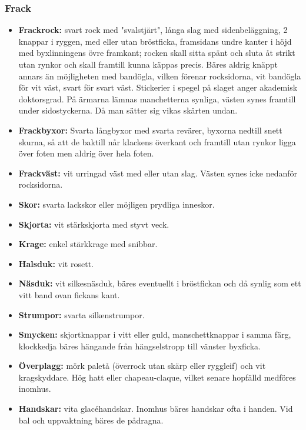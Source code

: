 \subsubsection*{\textbf{Frack}}
\begin{itemize}

    \item[]\textbf{Frackrock:} svart rock med "svalstjärt", långa slag med sidenbeläggning, 2 knappar i ryggen, med eller utan bröstficka, framsidans undre kanter i höjd med byxlinningens övre framkant; rocken skall sitta spänt och sluta åt strikt utan rynkor och skall framtill kunna käppas precis. Bäres aldrig knäppt annars än möjligheten med bandögla, vilken förenar rocksidorna, vit bandögla för vit väst, svart för svart väst. Stickerier i spegel på slaget anger akademisk doktorsgrad. På ärmarna lämnas manchetterna synliga, västen synes framtill under sidostyckerna. Då man sätter sig vikas skärten undan.

    \item[]\textbf{Frackbyxor:} Svarta långbyxor med svarta revärer, byxorna nedtill snett skurna, så att de baktill når klackens överkant och framtill utan rynkor ligga över foten men aldrig över hela foten.

    \item[]\textbf{Frackväst:} vit urringad väst med eller utan slag. Västen synes icke nedanför rocksidorna.

    \item[]\textbf{Skor:} svarta lackskor eller möjligen prydliga inneskor.

    \item[]\textbf{Skjorta:} vit stärkskjorta med styvt veck.

    \item[]\textbf{Krage:} enkel stärkkrage med snibbar.

    \item[]\textbf{Halsduk:} vit rosett.

    \item[]\textbf{Näsduk:} vit silkesnäsduk, bäres eventuellt i bröstfickan och då synlig som ett vitt band ovan fickans kant.

    \item[]\textbf{Strumpor:} svarta silkenstrumpor.

    \item[]\textbf{Smycken:} skjortknappar i vitt eller guld, manschettknappar i samma färg, klockkedja bäres hängande från hängselstropp till vänster byxficka.

    \item[]\textbf{Överplagg:} mörk paletå (överrock utan skärp eller ryggleif) och vit kragskyddare. Hög hatt eller chapeau-claque, vilket senare hopfälld medföres inomhus.

    \item[]\textbf{Handskar:} vita glacéhandskar. Inomhus bäres handskar ofta i handen. Vid bal och uppvaktning bäres de pådragna.

\end{itemize}

